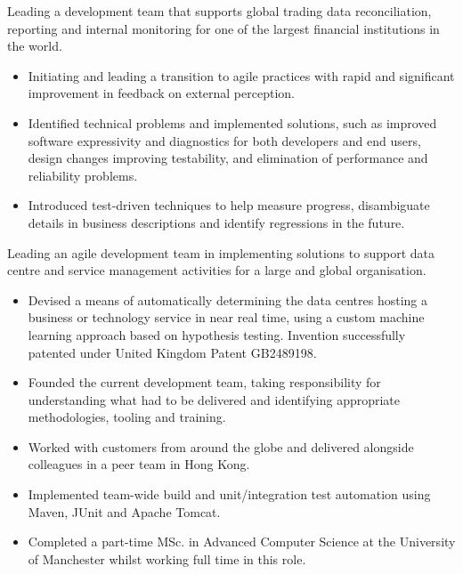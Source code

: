 \documentclass[11pt,a4paper,sans]{moderncv}        %
\begin{document}
{Leading a development team that supports global trading data reconciliation, reporting and internal monitoring for one of the largest financial institutions in the world.
\newline{}
\begin{itemize}
\item Initiating and leading a transition to agile practices with rapid and significant improvement in feedback on external perception.
\item Identified technical problems and implemented solutions, such as improved software expressivity and diagnostics for both developers and end users, design changes improving testability, and elimination of performance and reliability problems.
\item Introduced test-driven techniques to help measure progress, disambiguate details in business descriptions and identify regressions in the future.
\end{itemize}
}

{Leading an agile development team in implementing solutions to support data centre and service management activities for a large and global organisation.
\newline{}
\begin{itemize}
\item Devised a means of automatically determining the data centres hosting a business or technology service
in near real time, using a custom machine learning approach based on hypothesis testing.
Invention successfully patented under United Kingdom Patent GB2489198.
\item Founded the current development team,
taking responsibility for understanding what had to be delivered and
identifying appropriate methodologies, tooling and training.
\item Worked with customers from around the globe and delivered alongside colleagues in a peer team in Hong Kong.
\item Implemented team-wide build and unit/integration test automation using Maven, JUnit and Apache Tomcat.
\item Completed a part-time MSc. in Advanced Computer Science at the University of Manchester
whilst working full time in this role.
\end{itemize}
}

\end{document}
